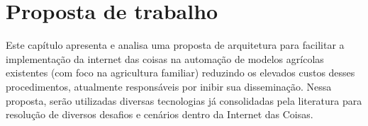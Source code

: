 \chapter{Proposta de trabalho} %
Este cap\'{i}tulo apresenta e analisa uma proposta de arquitetura para facilitar a implementa\c{c}\~{a}o da internet das coisas na automa\c{c}\~{a}o de modelos agrícolas existentes (com foco na agricultura familiar) reduzindo os elevados custos desses procedimentos, atualmente respons\'{a}veis por inibir sua dissemina\c{c}\~{a}o.
Nessa proposta, ser\~{a}o utilizadas diversas tecnologias j\'{a} consolidadas pela literatura para resolu\c{c}\~{a}o de diversos desafios e cen\'{a}rios dentro da Internet das Coisas.